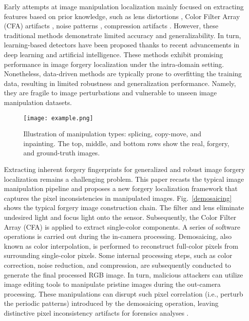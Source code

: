 \documentclass[10pt,journal,compsoc]{IEEEtran}
\begin{document}
Early attempts at image manipulation localization mainly focused on extracting features based on prior knowledge, such as lens distortions \cite{mayer2018accurate, yerushalmy2011digital, johnson2006exposing, yerushalmy2011digital, gloe2010efficient, fu2012forgery}, Color Filter Array (CFA) artifacts \cite{cao2009accurate, ferrara2012image, popescu2005exposing, gallagher2008image, ho2010inter}, noise patterns \cite{lyu2014exposing, kobayashi2010detecting, popescu2004statistical, mahdian2009using, cozzolino2015splicebuster, fan2013estimating}, compression artifacts \cite{fan2003identification, chen2011detecting, iakovidou2018content, barni2010identification, bianchi2012image, fu2007generalized, pasquini2017statistical}. However, these traditional methods demonstrate limited accuracy and generalizability. In turn, learning-based detectors have been proposed thanks to recent advancements in deep learning and artificial intelligence. These methods exhibit promising performance in image forgery localization under the intra-domain setting. Nonetheless, data-driven methods are typically prone to overfitting the training data, resulting in limited robustness and generalization performance. Namely, they are fragile to image perturbations and vulnerable to unseen image manipulation datasets. 

\begin{figure}[ht]
\centering
\texttt{[image:  example.png]}
\caption{Illustration of manipulation types: splicing, copy-move, and inpainting. The top, middle, and bottom rows show the real, forgery, and ground-truth images.}
\label{showcase_dist}
\end{figure}

Extracting inherent forgery fingerprints for generalized and robust image forgery localization remains a challenging problem. This paper recasts the typical image manipulation pipeline and proposes a new forgery localization framework that captures the pixel inconsistencies in manipulated images. Fig.~\ref{demosaicing} shows the typical forgery image construction chain. The filter and lens eliminate undesired light and focus light onto the sensor. Subsequently, the Color Filter Array (CFA) is applied to extract single-color components. A series of software operations is carried out during the in-camera processing. Demosaicing, also known as color interpolation, is performed to reconstruct full-color pixels from surrounding single-color pixels. Some internal processing steps, such as color correction, noise reduction, and compression, are subsequently conducted to generate the final processed RGB image. In turn, malicious attackers can utilize image editing tools to manipulate pristine images during the out-camera processing. These manipulations can disrupt such pixel correlation (i.e., perturb the periodic patterns) introduced by the demosaicing operation, leaving distinctive pixel inconsistency artifacts for forensics analyses \cite{cao2009accurate, popescu2005exposing, verdoliva2020media}. 
\end{document}
